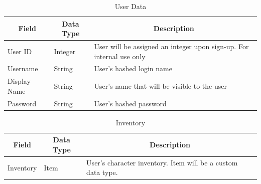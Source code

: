 \documentclass[12pt,letterpaper]{article}
\begin{document}
	\begin{table}[h]
		\centering
		\begin{tabular}{| l | l | p{7cm} |}
			\hline
			\multicolumn{1}{|c|}{\bf{Field}} & \multicolumn{1}{|c|}{\bf{Data Type}} & \multicolumn{1}{|c|}{\bf{Description}}\\ \hline
			User ID & Integer & User will be assigned an integer upon sign-up. For internal use only \\ \hline
			Username & String & User's hashed login name \\ \hline
			Display Name & String & User's name that will be visible to the user \\ \hline
			Password & String & User's hashed password \\ \hline 
		\end{tabular}
		\caption{User Data}
		\label{tab:tableUserData}
	\end{table}			

	\begin{table}[h]
		\centering
		\begin{tabular}{| l | l | p{7cm} |}
			\hline
			\multicolumn{1}{|c|}{\bf{Field}} & \multicolumn{1}{|c|}{\bf{Data Type}} & \multicolumn{1}{|c|}{\bf{Description}}\\ \hline
			Inventory & Item & User's character inventory. Item will be a custom data type. \\ \hline
		\end{tabular}
		\caption{Inventory}
		\label{tab:tableInventory}
	\end{table}			
	
\end{document}
